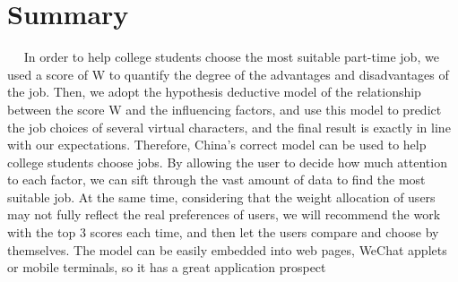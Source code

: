 \documentclass[12pt]{article}
\begin{document}
\section{Summary}%
~~%
In order to help college students choose the most suitable part-time job, we used a score of W to quantify the degree of the advantages and disadvantages of the job. Then, we adopt the hypothesis deductive model of the relationship between the score W and the influencing factors, and use this model to predict the job choices of several virtual characters, and the final result is exactly in line with our expectations. Therefore, China's correct model can be used to help college students choose jobs. By allowing the user to decide how much attention to each factor, we can sift through the vast amount of data to find the most suitable job. At the same time, considering that the weight allocation of users may not fully reflect the real preferences of users, we will recommend the work with the top 3 scores each time, and then let the users compare and choose by themselves. The model can be easily embedded into web pages, WeChat applets or mobile terminals, so it has a great application prospect
\newpage
\end{document}
